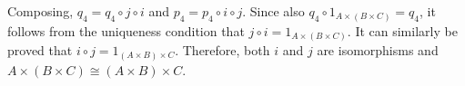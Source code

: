 \documentclass[12pt]{article}
\begin{document}
\begin{enumerate}
    Composing, $q_4 = q_4 \circ j \circ i$ and $p_4 = p_4 \circ i \circ j$. Since also $q_4 \circ 1_{A \times (B \times C)} = q_4$, it follows from the uniqueness condition that $j \circ i = 1_{A \times (B \times C)}$. It can similarly be proved that $i \circ j = 1_{(A \times B) \times C}$. Therefore, both $i$ and $j$ are isomorphisms and $A \times (B \times C) \cong (A \times B) \times C$.

\end{enumerate}
\end{document}
